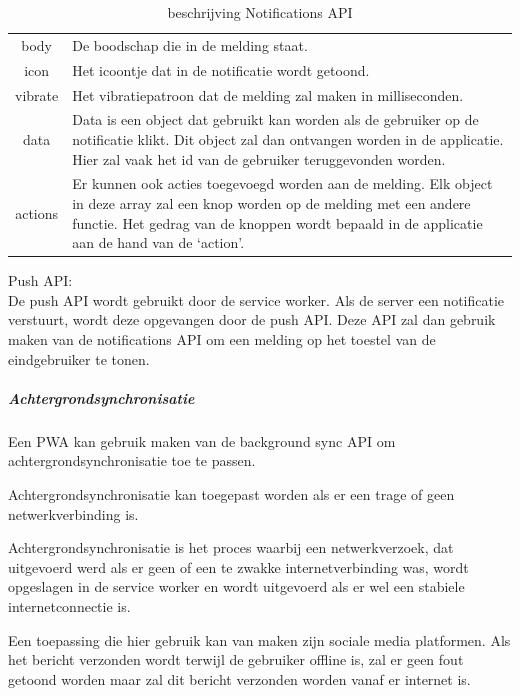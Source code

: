 			\begin{table}[H]
				\centering
				\begin{tabular}{cp{12cm}}
			       body & De boodschap die in de melding staat.  \\
			       icon & Het icoontje dat in de notificatie wordt getoond. \\
			       vibrate & Het vibratiepatroon dat de melding zal maken in milliseconden. \\
			       data & Data is een object dat gebruikt kan worden als de gebruiker op de notificatie  klikt. Dit object zal dan ontvangen worden in de applicatie. Hier zal vaak het id van de gebruiker teruggevonden worden. \\
			       actions & Er kunnen ook acties toegevoegd worden aan de melding. Elk object in deze array zal een knop worden op de melding met een andere functie. Het gedrag van de knoppen wordt bepaald in de applicatie aan de hand van de ‘action’. \\
				\end{tabular}	
				\caption{beschrijving Notifications API}
				\label{tabelNotification}
			\end{table}
			\autocite{Developers2019}
			\autocite{Mozilla2019a}
			

			Push API:	\\
	
				
			De push API wordt gebruikt door de service worker. Als de server een notificatie verstuurt, wordt deze opgevangen door de push API. Deze API zal dan gebruik maken van de notifications API om een melding op het toestel van de eindgebruiker te tonen.
			\autocite{Mozilla2019b}
			\autocite{Gaunt2020}
	
		\subparagraph{Achtergrondsynchronisatie }
		Een PWA kan gebruik maken van de background sync API om achtergrondsynchronisatie toe te passen.
		
		Achtergrondsynchronisatie kan toegepast worden als er een trage of geen netwerkverbinding is. 
		
		Achtergrondsynchronisatie is het proces waarbij een netwerkverzoek, dat uitgevoerd werd als er geen of een te zwakke internetverbinding was, wordt opgeslagen in de service worker en wordt uitgevoerd als er wel een stabiele internetconnectie is.
	
		Een toepassing die hier gebruik kan van maken zijn sociale media platformen. Als het bericht verzonden wordt terwijl de gebruiker offline is, zal er geen fout getoond worden maar zal dit bericht verzonden worden vanaf er internet is.
		
